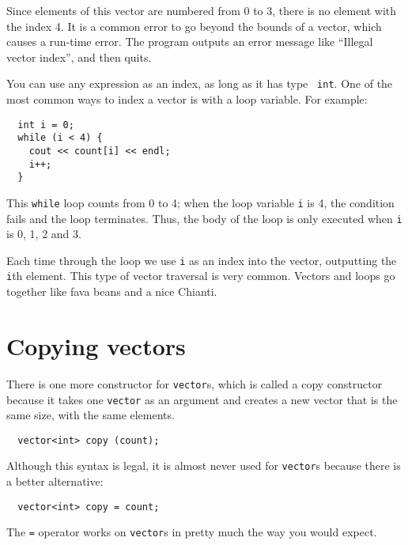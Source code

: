 \vspace{0.1in}
\centerline{}
\vspace{0.1in}

Since elements of this vector are numbered from 0 to 3, there is no
element with the index 4.  It is a common error to go beyond the
bounds of a vector, which causes a run-time error.  The program outputs
an error message like ``Illegal vector index'', and then quits.


You can use any expression as an index, as long as it has type {\tt
int}.  One of the most common ways to index a vector is with a loop
variable.  For example:

\begin{verbatim}
  int i = 0;
  while (i < 4) {
    cout << count[i] << endl;
    i++;
  }
\end{verbatim}
%
This {\tt while} loop counts from 0
to 4; when the loop variable {\tt i} is 4, the
condition fails and the loop terminates.  Thus, the body
of the loop is only executed when {\tt i} is 0, 1, 2 and 3.


Each time through the loop we use {\tt i} as an index into
the vector, outputting the {\tt i}th element.  This type of
vector traversal is very common.  Vectors and loops go together
like fava beans and a nice Chianti.

\section{Copying vectors}

There is one more constructor for {\tt vector}s, which is
called a copy constructor because it takes one {\tt vector}
as an argument and creates a new vector that is the same size,
with the same elements.

\begin{verbatim}
  vector<int> copy (count);
\end{verbatim}
%
Although this syntax is legal, it is almost never used for
{\tt vector}s because there is a better alternative:

\begin{verbatim}
  vector<int> copy = count;
\end{verbatim}
%
The {\tt =} operator works on {\tt vector}s in pretty much
the way you would expect.

